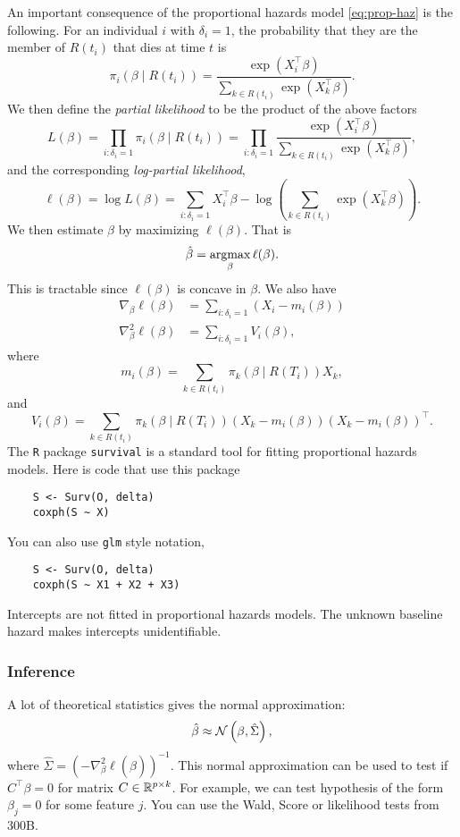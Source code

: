 An important consequence of the proportional hazards model \eqref{eq:prop-haz} is the following. For an individual $i$ with $\delta_i=1$, the probability that they are the member of $R(t_i)$ that dies at time $t$ is 
\[\pi_i(\beta\mid R(t_i)) = \frac{\exp(X_i^\top \beta)}{\sum_{k \in R(t_i)} \exp(X_k^\top \beta)}. \]
We then define the \emph{partial likelihood} to be the product of the above factors 
\[L(\beta) = \prod_{i:\delta_i=1} \pi_i(\beta \mid R(t_i)) = \prod_{i:\delta_i = 1}\frac{\exp(X_i^\top \beta)}{\sum_{k \in R(t_i)} \exp(X_k^\top \beta)}, \]
and the corresponding \emph{log-partial likelihood},
\[\ell(\beta) = \log L(\beta) = \sum_{i:\delta_i = 1} X_i^\top \beta -\log \left(\sum_{k \in R(t_i)} \exp(X_k^\top \beta)\right). \]
We then estimate $\beta$ by maximizing $\ell(\beta)$. That is
\[\hat{\beta} = \operatorname*{argmax}_{\beta} \ell(\beta). \]
This is tractable since $\ell(\beta)$ is concave in $\beta$. We also have
\begin{align*}
    \nabla_\beta \ell(\beta) &=\sum_{i :\delta_i = 1}\left( X_i - m_i(\beta)\right)\\
    \nabla^2_\beta \ell(\beta) &=\sum_{i:\delta_i=1}V_i(\beta),
\end{align*}
where
\[m_i(\beta) = \sum_{k \in R(t_i)}\pi_k(\beta \mid R(T_i))X_k,\]
and
\[ V_i(\beta) = \sum_{k \in R(t_i)}\pi_k(\beta \mid R(T_i))(X_k - m_i(\beta))(X_k - m_i(\beta))^\top.\]
The \verb|R| package \verb|survival| is a standard tool for fitting proportional hazards models. Here is code that use this package
\begin{lstlisting}
    S <- Surv(O, delta)
    coxph(S ~ X)
\end{lstlisting}
You can also use \verb|glm| style notation,
\begin{lstlisting}
    S <- Surv(O, delta)
    coxph(S ~ X1 + X2 + X3)
\end{lstlisting}
Intercepts are not fitted in proportional hazards models. The unknown baseline hazard makes intercepts unidentifiable.


\subsubsection*{Inference}
A lot of theoretical statistics gives the normal approximation:
\[\hat{\beta} \approx {\mathcal N}\left(\beta, \hat{\Sigma}\right), \]
where $\hat{\Sigma} = \left(-\nabla^2_\beta \ell(\hat{\beta})\right)^{-1}$. This normal approximation can be used to test if $C^\top\beta = 0$ for matrix $C \in \mathbb{R}^{p \times k}$. For example, we can test hypothesis of the form $\beta_j=0$ for some feature $j$. You can use the Wald, Score or likelihood tests from 300B.

